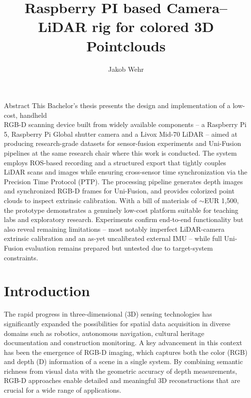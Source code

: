 \documentclass[english, bachelor, utf8]{base/thesis_telematics}
\begin{document}
\title{Raspberry PI based Camera--LiDAR rig for colored 3D Pointclouds}
\author{Jakob Wehr}
\thirdSupervisor{}

\generatetitle

\cleardoublepage

\begin{prefacesection}{Abstract}
This Bachelor's thesis presents the design and implementation of a low-cost, handheld \\RGB-D scanning device
built from widely available components -- a Raspberry Pi 5, Raspberry Pi Global shutter camera and a Livox Mid-70
LiDAR -- aimed at producing research-grade datasets for sensor-fusion experiments and Uni-Fusion pipelines
at the same research chair where this work is conducted. The system employs ROS-based recording and a
structured export that tightly couples LiDAR scans and images while ensuring cross-sensor
time synchronization via the Precision Time Protocol (PTP). The processing pipeline generates depth images
and synchronized RGB-D frames for Uni-Fusion, and provides colorized point clouds to inspect extrinsic
calibration. With a bill of materials of $\sim$EUR 1{,}500, the prototype demonstrates a genuinely low-cost
platform suitable for teaching labs and exploratory research. Experiments confirm end-to-end functionality
but also reveal remaining limitations -- most notably imperfect LiDAR-camera extrinsic calibration and an
as-yet uncalibrated external IMU -- while full Uni-Fusion evaluation remains prepared but untested due to
target-system constraints.
\end{prefacesection}

\cleardoublepage
\tableofcontents


\startTextChapters %

\chapter{Introduction}

The rapid progress in three-dimensional (3D) sensing technologies has significantly expanded the possibilities 
for spatial data acquisition in diverse domains such as robotics, autonomous navigation, cultural heritage 
documentation and construction monitoring. A key advancement in this context has been the emergence of 
RGB-D imaging, which captures both the color (RGB) and depth (D) information of a scene in a single system. 
By combining semantic richness from visual data with the geometric accuracy of depth measurements, RGB-D 
approaches enable detailed and meaningful 3D reconstructions that are crucial for a wide range of applications.
\end{document}
